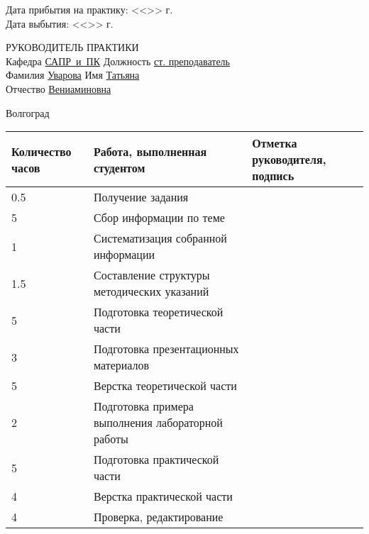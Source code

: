 \documentclass[a4paper, 14pt]{extreport}
\begin{document}
\begin{titlepage}
\begin{flushleft}
            Дата прибытия на практику: <<\underline{\hspace{1cm}}>> \underline{\hspace{3cm}} 
            \the\year г.\\
            Дата выбытия: \hspace{3cm}<<\underline{\hspace{1cm}}>> \underline{\hspace{3cm}} 
            \the\year г.
        \end{flushleft}
        \vspace{2cm}
        \begin{flushleft}
            РУКОВОДИТЕЛЬ ПРАКТИКИ\\
            Кафедра \underline{САПР~и~ПК\hspace{2.4cm}} Должность \underline{ст. преподаватель\hspace{2.45em}} \\
            Фамилия \underline{Уварова\hspace{3.15cm}} Имя \underline{Татьяна\hspace{4.85cm}}\\
            Отчество \underline{Вениаминовна\hspace{1.65cm}}
        \end{flushleft}
        \vspace{\fill}
        \begin{center}
            Волгоград \the\year
        \end{center}
    \end{titlepage}
    \begin{table}[h!]
        \centering
        \begin{tabular}{|m{}|m{}|m{}|}
            \hline
            Количество часов & Работа, выполненная студентом & Отметка
            руководителя, подпись \\ \hline
            0.5 & Получение задания & \\ \hline
            5 & Сбор информации по теме & \\ \hline
            1 & Систематизация собранной информации & \\ \hline
            1.5 & Составление структуры методических указаний & \\ \hline
            5 & Подготовка теоретической части & \\ \hline
            3 & Подготовка презентационных материалов & \\ \hline
            5 & Верстка теоретической части & \\ \hline
            2 & Подготовка примера выполнения лабораторной работы & \\ \hline
            5 & Подготовка практической части & \\ \hline
            4 & Верстка практической части & \\ \hline
            4 & Проверка, редактирование & \\ \hline
        \end{tabular}
    \end{table}
\end{document}
